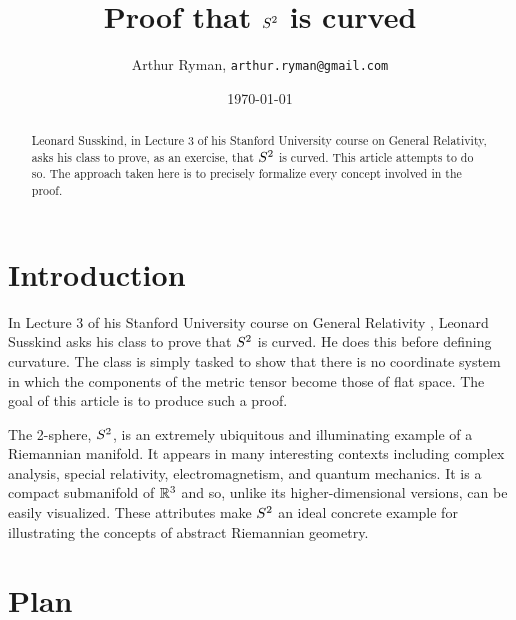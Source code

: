 \documentclass[11pt, oneside]{article}
\title{Proof that $S^2$ is curved}
\author{Arthur Ryman, {\tt arthur.ryman@gmail.com}}
\date{\today}
\begin{document}
\maketitle

\begin{abstract}
Leonard Susskind,  in Lecture 3 of his Stanford University course on General Relativity,
asks his class to prove, as an exercise, that $S^2$ is curved.
This article attempts to do so.
The approach taken here is to precisely formalize every concept involved in the proof.
\end{abstract}

\section{Introduction}

In Lecture 3 of his Stanford University course on General Relativity \cite{susskind-gr3},
Leonard Susskind asks his class to prove that $S^2$ is curved.
He does this before defining curvature.
The class is simply tasked to show that there is no coordinate system in which the components
of the metric tensor become those of flat space.
The goal of this article is to produce such a proof.

The 2-sphere, $S^2$, is an extremely ubiquitous and illuminating example of a Riemannian manifold.
It appears in many interesting contexts including complex analysis, special relativity, electromagnetism, and quantum mechanics.
It is a compact submanifold of $\mathbb{R}^3$ and so, unlike its higher-dimensional versions, can be easily visualized.
These attributes make $S^2$ an ideal concrete example for illustrating the concepts of 
abstract Riemannian geometry.

\section{Plan}
\end{document}

